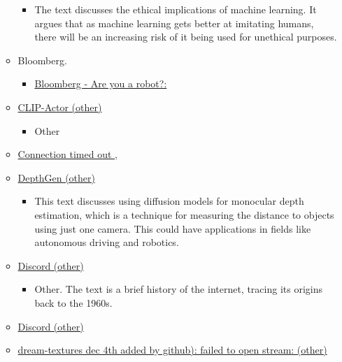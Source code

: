 \begin{itemize}
\begin{itemize}
    \begin{itemize}
     
    \item
      The text discusses the ethical implications of machine learning.
      It argues that as machine learning gets better at imitating
      humans, there will be an increasing risk of it being used for
      unethical purposes.
    \end{itemize}
  \item
    Bloomberg.

    \begin{itemize}
     
    \item
      \href{https://www.bloomberg.com/news/articles/2023-02-21/amazon-s-aws-joins-with-ai-startup-hugging-face-as-chatgpt-competition-heats-up}{Bloomberg
      - Are you a robot?:}
    \end{itemize}
  \item
    \href{https://clip-actor.github.io}{CLIP-Actor (other)}

    \begin{itemize}
     
    \item
      Other
    \end{itemize}
  \item
    \href{https://donnerlab.com/}{Connection timed out ,}
  \item
    \href{https://depth-gen.github.io/}{DepthGen (other)}

    \begin{itemize}
     
    \item
      This text discusses using diffusion models for monocular depth
      estimation, which is a technique for measuring the distance to
      objects using just one camera. This could have applications in
      fields like autonomous driving and robotics.
    \end{itemize}
  \item
    \href{https://discord.gg/2xndhbssvv}{Discord (other)}

    \begin{itemize}
     
    \item
      Other. The text is a brief history of the internet, tracing its
      origins back to the 1960s.
    \end{itemize}
  \item
    \href{https://discord.gg/tpd9h8kvbd}{Discord (other)}
  \item
    \href{https://github.com/carson-katri/dream-textures\%7Ccarson-katri/dream-textures\%3Ecarson-katri/dream-textures\%20\%7C\%20dec\%204th\%20\%7C\%20added\%20by\%20github}{dream-textures
    \textbar{} dec 4th \textbar{} added by github): failed to open
    stream: (other)}


\end{itemize}
\end{itemize}
